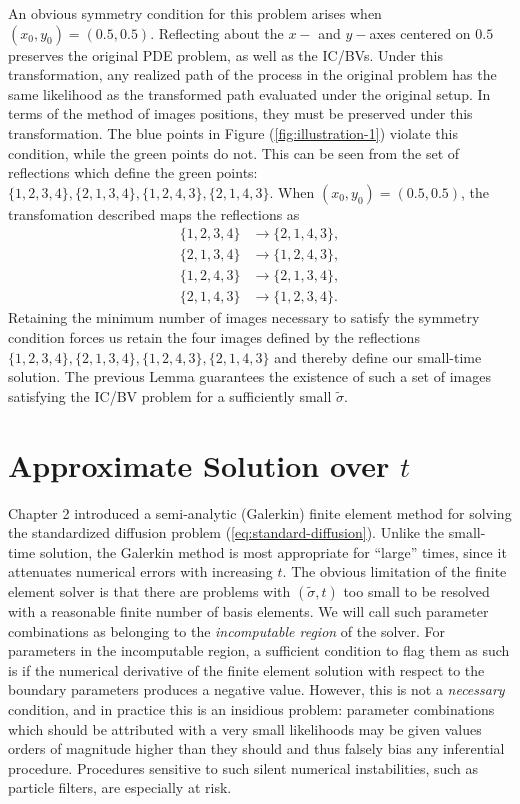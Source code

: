 \documentclass[10pt]{article}
\begin{document}
An obvious symmetry condition for this problem arises when
$(x_0, y_0) = (0.5, 0.5)$. Reflecting about the $x-$ and $y-$axes
centered on $0.5$ preserves the original PDE problem, as well as the
IC/BVs. Under this transformation, any realized path of the process in
the original problem has the same likelihood as the transformed path
evaluated under the original setup. In terms of the method of images
positions, they must be preserved under this transformation. The blue
points in Figure (\ref{fig:illustration-1}) violate this condition,
while the green points do not. This can be seen from the set of
reflections which define the green points:
$\{1,2,3,4 \},\{2,1,3,4 \},\{1,2,4,3 \},\{2,1,4,3 \}.$ When
$(x_0, y_0) = (0.5, 0.5)$, the transfomation described maps the
reflections as
\begin{align*}
  \{1,2,3,4 \} & \to \{2,1,4,3 \}, \\
  \{2,1,3,4 \} &\to \{1,2,4,3 \}, \\
  \{1,2,4,3 \} &\to \{2,1,3,4 \}, \\
  \{2,1,4,3 \} &\to \{1,2,3,4 \}.
\end{align*}
Retaining the minimum number of images necessary to satisfy the
symmetry condition forces us retain the four images defined by the
reflections $\{1,2,3,4 \},\{2,1,3,4 \},\{1,2,4,3 \},\{2,1,4,3 \}$ and
thereby define our small-time solution. The previous Lemma guarantees
the existence of such a set of images satisfying the IC/BV problem for
a sufficiently small $\tilde{\sigma}.$ 


\section{Approximate Solution over $t$} \label{sec:modes}
Chapter 2 introduced a semi-analytic (Galerkin) finite element method
for solving the standardized diffusion problem
(\ref{eq:standard-diffusion}). Unlike the small-time solution, the
Galerkin method is most appropriate for ``large'' times, since it
attenuates numerical errors with increasing $t$. The obvious
limitation of the finite element solver is that there are problems
with $(\tilde{\sigma}, t)$ too small to be resolved with a reasonable
finite number of basis elements. We will call such parameter
combinations as belonging to the \textit{incomputable region} of the
solver. For parameters in the incomputable region, a sufficient
condition to flag them as such is if the numerical derivative of the
finite element solution with respect to the boundary parameters
produces a negative value. However, this is not a \textit{necessary}
condition, and in practice this is an insidious problem: parameter
combinations which should be attributed with a very small likelihoods
may be given values orders of magnitude higher than they should and
thus falsely bias any inferential procedure. Procedures sensitive to
such silent numerical instabilities, such as particle filters, are
especially at risk.
\end{document}
